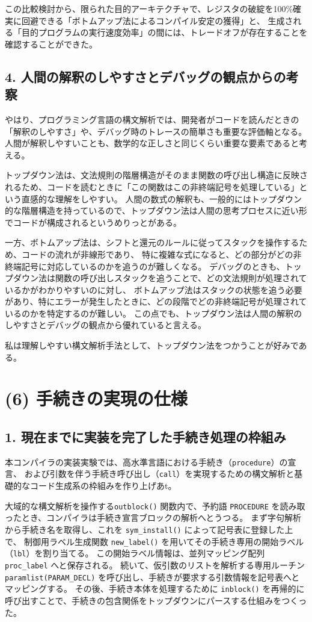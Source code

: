 \documentclass[11pt,a4paper,dvipdfmx]{bxjsarticle}
\begin{document}
この比較検討から、限られた目的アーキテクチャで、レジスタの破綻を100\%確実に回避できる「ボトムアップ法によるコンパイル安定の獲得」と、
生成される「目的プログラムの実行速度効率」の間には、トレードオフが存在することを確認することができた。

\subsection*{4. 人間の解釈のしやすさとデバッグの観点からの考察}
やはり、プログラミング言語の構文解析では、開発者がコードを読んだときの「解釈のしやすさ」や、デバッグ時のトレースの簡単さも重要な評価軸となる。
人間が解釈しやすいことも、数学的な正しさと同じくらい重要な要素であると考える。

トップダウン法は、文法規則の階層構造がそのまま関数の呼び出し構造に反映されるため、コードを読むときに「この関数はこの非終端記号を処理している」という直感的な理解をしやすい。
人間の数式の解釈も、一般的にはトップダウン的な階層構造を持っているので、トップダウン法は人間の思考プロセスに近い形でコードが構成されるというめりっとがある。

一方、ボトムアップ法は、シフトと還元のルールに従ってスタックを操作するため、コードの流れが非線形であり、
特に複雑な式になると、どの部分がどの非終端記号に対応しているのかを追うのが難しくなる。
デバッグのときも、トップダウン法は関数の呼び出しスタックを追うことで、どの文法規則が処理されているかがわかりやすいのに対し、
ボトムアップ法はスタックの状態を追う必要があり、特にエラーが発生したときに、どの段階でどの非終端記号が処理されているのかを特定するのが難しい。
この点でも、トップダウン法は人間の解釈のしやすさとデバッグの観点から優れていると言える。

私は理解しやすい構文解析手法として、トップダウン法をつかうことが好みである。

\section*{(6) 手続きの実現の仕様}

\subsection*{1. 現在までに実装を完了した手続き処理の枠組み}
本コンパイラの実装実験では、高水準言語における手続き（\texttt{procedure}）の宣言、
および引数を伴う手続き呼び出し（\texttt{call}）を実現するための構文解析と基礎的なコード生成系の枠組みを作り上げあt。

大域的な構文解析を操作する\texttt{outblock()} 関数内で、予約語 \texttt{PROCEDURE} を読み取ったとき、コンパイラは手続き宣言ブロックの解析へとうつる。
まず字句解析から手続き名を取得し、これを \texttt{sym\_install()} によって記号表に登録した上で、
制御用ラベル生成関数 \texttt{new\_label()} を用いてその手続き専用の開始ラベル（\texttt{lbl}）を割り当てる。
この開始ラベル情報は、並列マッピング配列 \texttt{proc\_label} へと保存される。
続いて、仮引数のリストを解析する専用ルーチン \texttt{paramlist(PARAM\_DECL)} を呼び出し、手続きが要求する引数情報を記号表へとマッピングする。
その後、手続き本体を処理するために \texttt{inblock()} を再帰的に呼び出すことで、手続きの包含関係をトップダウンにパースする仕組みをつくった。
\end{document}
